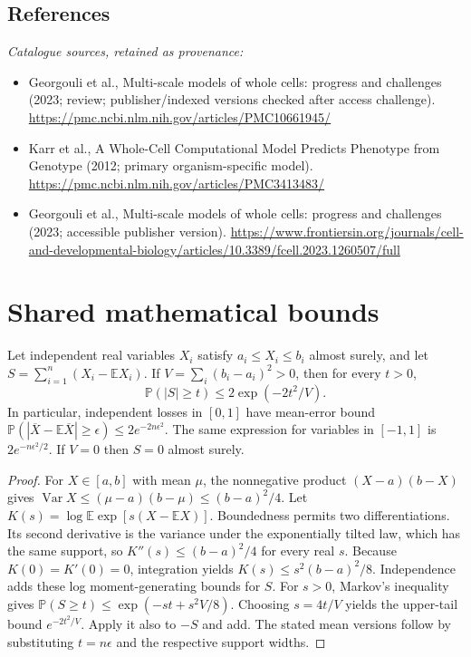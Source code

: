 \documentclass[11pt]{article}
\begin{document}
\subsection{References}
\noindent\emph{Catalogue sources, retained as provenance:}
\begin{itemize}
\item Georgouli et al., Multi-scale models of whole cells: progress and challenges (2023; review; publisher/indexed versions checked after access challenge). \url{https://pmc.ncbi.nlm.nih.gov/articles/PMC10661945/}
\item Karr et al., A Whole-Cell Computational Model Predicts Phenotype from Genotype (2012; primary organism-specific model). \url{https://pmc.ncbi.nlm.nih.gov/articles/PMC3413483/}
\item Georgouli et al., Multi-scale models of whole cells: progress and challenges (2023; accessible publisher version). \url{https://www.frontiersin.org/journals/cell-and-developmental-biology/articles/10.3389/fcell.2023.1260507/full}
\end{itemize}




\section{Shared mathematical bounds}\label{app:bounds}
\begin{lemma}\label{lem:bounded}
Let independent real variables $X_i$ satisfy $a_i\leq X_i\leq b_i$ almost surely,
and let $S=\sum_{i=1}^n(X_i-\mathbb{E} X_i)$. If
$V=\sum_i(b_i-a_i)^2>0$, then for every $t>0$,
\[
 \mathbb{P}(|S|\geq t)\leq 2\exp(-2t^2/V).
\]
In particular, independent losses in $[0,1]$ have mean-error bound
$\mathbb{P}(|\overline X-\mathbb{E}\overline X|\geq\epsilon)
\leq2e^{-2n\epsilon^2}$. The same expression for variables in $[-1,1]$
is $2e^{-n\epsilon^2/2}$. If $V=0$ then $S=0$ almost surely.
\end{lemma}
\begin{proof}
For $X\in[a,b]$ with mean $\mu$, the nonnegative product
$(X-a)(b-X)$ gives
$\operatorname{Var} X\leq(\mu-a)(b-\mu)\leq(b-a)^2/4$.
Let $K(s)=\log\mathbb{E}\exp[s(X-\mathbb{E} X)]$.
Boundedness permits two differentiations. Its second derivative is the variance
under the exponentially tilted law, which has the same support, so
$K''(s)\leq(b-a)^2/4$ for every real $s$.
Because $K(0)=K'(0)=0$, integration yields
$K(s)\leq s^2(b-a)^2/8$.
Independence adds these log moment-generating bounds for $S$.
For $s>0$, Markov's inequality gives
$\mathbb{P}(S\geq t)\leq\exp(-st+s^2V/8)$.
Choosing $s=4t/V$ yields the upper-tail bound $e^{-2t^2/V}$.
Apply it also to $-S$ and add. The stated mean versions follow by substituting
$t=n\epsilon$ and the respective support widths.
\end{proof}
\end{document}

